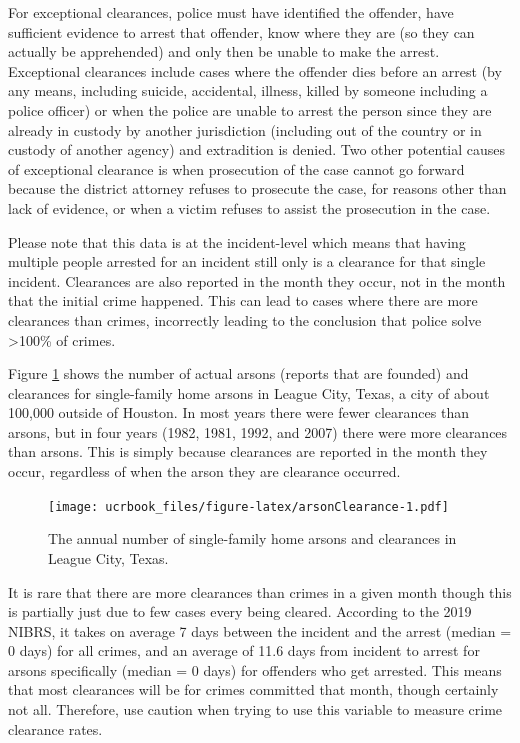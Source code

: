 \documentclass[
  12pt,
  openany]{book}
\begin{document}
For exceptional clearances, police must have identified the offender, have sufficient evidence to arrest that offender, know where they are (so they can actually be apprehended) and only then be unable to make the arrest. Exceptional clearances include cases where the offender dies before an arrest (by any means, including suicide, accidental, illness, killed by someone including a police officer) or when the police are unable to arrest the person since they are already in custody by another jurisdiction (including out of the country or in custody of another agency) and extradition is denied. Two other potential causes of exceptional clearance is when prosecution of the case cannot go forward because the district attorney refuses to prosecute the case, for reasons other than lack of evidence, or when a victim refuses to assist the prosecution in the case.

Please note that this data is at the incident-level which means that having multiple people arrested for an incident still only is a clearance for that single incident. Clearances are also reported in the month they occur, not in the month that the initial crime happened. This can lead to cases where there are more clearances than crimes, incorrectly leading to the conclusion that police solve \textgreater100\% of crimes.

Figure \ref{fig:arsonClearance} shows the number of actual arsons (reports that are founded) and clearances for single-family home arsons in League City, Texas, a city of about 100,000 outside of Houston. In most years there were fewer clearances than arsons, but in four years (1982, 1981, 1992, and 2007) there were more clearances than arsons. This is simply because clearances are reported in the month they occur, regardless of when the arson they are clearance occurred.

\begin{figure}
\centering
\texttt{[image: ucrbook\_files/figure-latex/arsonClearance-1.pdf]}
\caption{\label{fig:arsonClearance}The annual number of single-family home arsons and clearances in League City, Texas.}
\end{figure}

It is rare that there are more clearances than crimes in a given month though this is partially just due to few cases every being cleared. According to the 2019 NIBRS, it takes on average 7 days between the incident and the arrest (median = 0 days) for all crimes, and an average of 11.6 days from incident to arrest for arsons specifically (median = 0 days) for offenders who get arrested. This means that most clearances will be for crimes committed that month, though certainly not all. Therefore, use caution when trying to use this variable to measure crime clearance rates.
\end{document}
